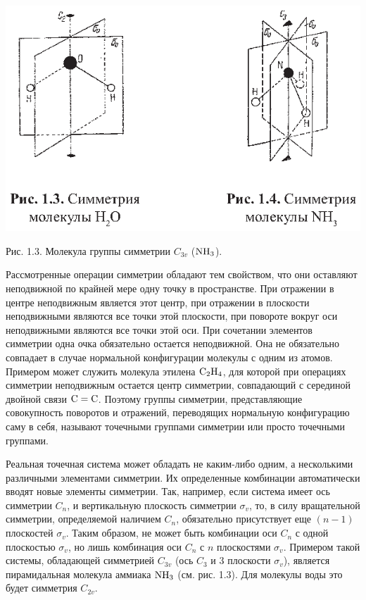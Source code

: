 \vskip 3mm
\centerline{\hbox{\includegraphics[scale=0.55]{Ris/ris_eps/ris1_03.eps}}}

\leftskip 0cm \centerline{\ris Рис. 1.3. Молекула группы симметрии
$C_{3v}$ ($\rm NH_3$).} \vskip 2mm Рассмотренные операции
симметрии обладают тем свойством, что они оставляют неподвижной по
крайней мере одну точку в пространстве. При отражении в центре
неподвижным является этот центр, при отражении в плоскости
неподвижными являются все точки этой плоскости, при повороте
вокруг оси неподвижными являются все точки этой оси. При сочетании
элементов симметрии одна очка обязательно остается неподвижной.
Она не обязательно совпадает в случае нормальной конфигурации
молекулы с одним из атомов. Примером может служить молекула
этилена ${\rm C_2H_4}$, для которой при операциях симметрии
неподвижным остается центр симметрии, совпадающий с серединой
двойной связи ${\rm C=C}$. Поэтому группы симметрии,
представляющие совокупность поворотов и отражений, переводящих
нормальную конфигурацию саму в себя, называют точечными группами
симметрии или просто точечными группами.

Реальная точечная система может обладать не каким-либо одним, а
несколькими различными элементами симметрии. Их определенные
комбинации автоматически вводят новые элементы симметрии. Так,
например, если система имеет ось симметрии $C_n$, и вертикальную
плоскость симметрии $\sigma_v$, то, в силу вращательной симметрии,
определяемой наличием $C_n$, обязательно присутствует еще $(n-1)$
плоскостей $\sigma_v$. Таким образом, не может быть комбинации оси
$C_n$ с одной плоскостью $\sigma_v$, но лишь комбинация оси $C_n$
с $n$ плоскостями $\sigma_v$. Примером такой системы, обладающей
симметрией $C_{3v}$ (ось $C_3$ и 3 плоскости $\sigma_v$), является
пирамидальная молекула аммиака ${\rm NH_3}$ (см. рис. 1.3). Для
молекулы воды это будет симметрия $C_{2v}$.

